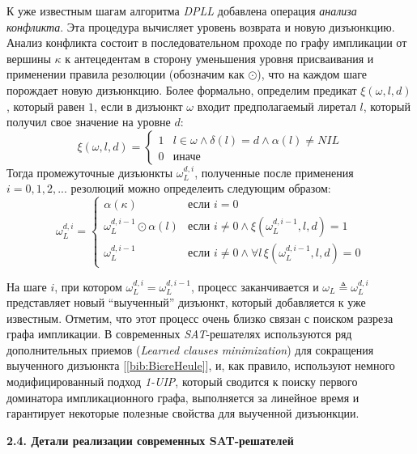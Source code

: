 К уже известным шагам алгоритма \textit{DPLL} добавлена операция \textit{анализа конфликта}. 
Эта процедура вычисляет уровень возврата и новую дизъюнкцию. Анализ конфликта состоит в последовательном проходе по графу импликации от вершины $\kappa$ к антецедентам в сторону уменьшения уровня присваивания и применении правила резолюции (обозначим как $\odot$), что на каждом шаге порождает новую дизъюнкцию. Более формально, определим предикат $\xi(\omega, l, d)$, который равен $1$, если в дизъюнкт $\omega$ входит предполагаемый лиретал $l$, который получил свое значение на уровне $d$:
\begin{equation*}
\xi(\omega, l, d) = 
\begin{cases}
1 & l \in \omega \land \delta(l) = d \land \alpha(l) \ne NIL \\
0 & \text{иначе}
\end{cases}
\end{equation*}
Тогда промежуточные дизъюнкты $\omega_{L}^{d,i}$, полученные после применения $i=0,1,2,...$ резолюций можно определеить следующим образом:
\begin{equation*}
\omega_{L}^{d,i} = 
\begin{cases}
\alpha(\kappa) & \text{если } i = 0 \\
\omega_{L}^{d,i-1} \odot \alpha(l) & \text{если } i \ne 0 \land \xi(\omega_{L}^{d,i-1}, l, d) = 1 \\
\omega_{L}^{d,i-1} & \text{если } i \ne 0 \land \forall l \, \xi(\omega_{L}^{d,i-1}, l, d) = 0
\end{cases}
\end{equation*}

На шаге $i$, при котором $\omega_{L}^{d,i} = \omega_{L}^{d,i-1}$, процесс заканчивается и $\omega_{L} \triangleq \omega_{L}^{d,i}$ представляет новый \enquote{выученный} дизъюнкт, который добавляется к уже известным.
Отметим, что этот процесс очень близко связан с поиском разреза графа импликации. В современных \textit{SAT}-решателях используются ряд дополнительных приемов (\textit{Learned clauses minimization}) для сокращения выученного дизъюнкта [\ref{bib:BiereHeule}], и, как правило, используют немного модифицированный подход \textit{1-UIP}, который сводится к поиску первого доминатора импликационного графа, выполняется за линейное время и гарантирует некоторые полезные свойства для выученной дизъюнкции.

\vspace{5pt}
\textbf{2.4. Детали реализации современных SAT-решателей}\label{chapters:2.4}
\vspace{5pt}

